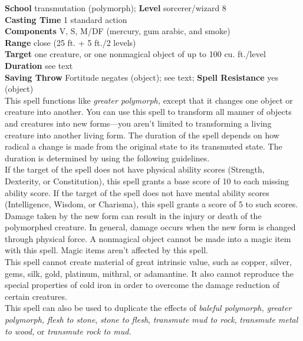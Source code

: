 \textbf{School} transmutation (polymorph); \textbf{Level} sorcerer/wizard 8\\
\textbf{Casting Time} 1 standard action\\
\textbf{Components} V, S, M/DF (mercury, gum arabic, and smoke)\\
\textbf{Range} close (25 ft. + 5 ft./2 levels)\\
\textbf{Target} one creature, or one nonmagical object of up to 100 cu. ft./level\\
\textbf{Duration} see text\\
\textbf{Saving Throw} Fortitude negates (object); see text; \textbf{Spell Resistance} yes (object)\\
This spell functions like \textit{greater polymorph, }except that it changes one object or creature into another. You can use this spell to transform all manner of objects and creatures into new forms---you aren't limited to transforming a living creature into another living form. The duration of the spell depends on how radical a change is made from the original state to its transmuted state. The duration is determined by using the following guidelines.\\
If the target of the spell does not have physical ability scores (Strength, Dexterity, or Constitution), this spell grants a base score of 10 to each missing ability score. If the target of the spell does not have mental ability scores (Intelligence, Wisdom, or Charisma)\textit{,} this spell grants a score of 5 to such scores. Damage taken by the new form can result in the injury or death of the polymorphed creature. In general, damage occurs when the new form is changed through physical force. A nonmagical object cannot be made into a magic item with this spell. Magic items aren't affected by this spell.\\
This spell cannot create material of great intrinsic value, such as copper, silver, gems, silk, gold, platinum, mithral, or adamantine. It also cannot reproduce the special properties of cold iron in order to overcome the damage reduction of certain creatures.\\
This spell can also be used to duplicate the effects of \textit{baleful polymorph, greater polymorph, flesh to stone}, \textit{stone to flesh}, \textit{transmute mud to rock}, \textit{transmute metal to wood, }or \textit{transmute rock to mud.}\\
